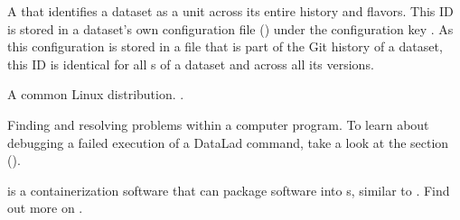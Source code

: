 \begin{description}
\ignorespaces 
\sphinxAtStartPar
A {\hyperref[\detokenize{glossary:term-UUID}]{}} that identifies a dataset as a unit \textendash{} across its entire history and flavors.
This ID is stored in a dataset’s own configuration file ()
under the configuration key .
As this configuration is stored in a file that is part of the Git
history of a dataset, this ID is identical for all {\hyperref[\detokenize{glossary:term-clone}]{}}s of a dataset and across all
its versions.

\sphinxAtStartPar
A common Linux distribution. .

\sphinxAtStartPar
Finding and resolving problems within a computer program.
To learn about debugging a failed execution of a DataLad command, take a look at the section {\hyperref[\detokenize{basics/101-135-help:debug}]{}} ().

\sphinxAtStartPar
{} is a containerization software that can package software into {\hyperref[\detokenize{glossary:term-software-container}]{}}s, similar to {\hyperref[\detokenize{glossary:term-Singularity}]{}}.
Find out more on .


\end{description}
